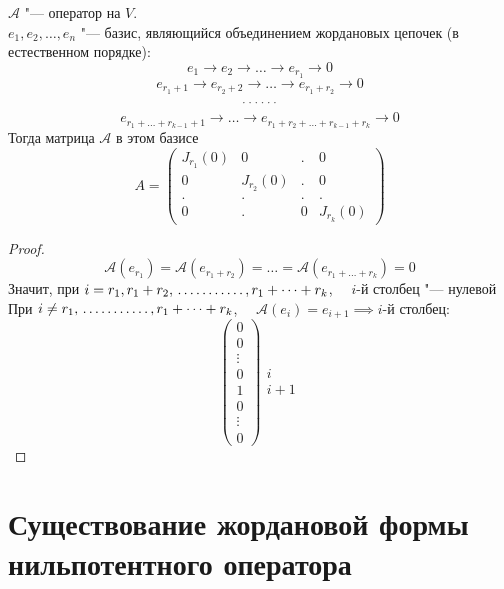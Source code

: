 \begin{lemma}
	$ \mathcal{A} $ "--- оператор на $ V $. \\
    $ e_1, e_2, \dots, e_n $ "--- базис, являющийся объединением жордановых цепочек (в естественном порядке):
	$$ e_1 \to e_2 \to \dots \to e_{r_1} \to 0 $$
	$$ e_{r_1 + 1} \to e_{r_2 + 2} \to \dots \to e_{r_1 + r_2} \to 0 $$
	$$ \widedots $$
	$$ e_{r_1 + \dots + r_{k - 1} + 1} \to \dots \to e_{r_1 + r_2 + \dots + r_{k - 1} + r_k} \to 0 $$
	Тогда матрица $ \mathcal{A} $ в этом базисе
	$$ A =
	\begin{pmatrix}
		J_{r_1}(0) & 0 & . & 0 \\
		0 & J_{r_2}(0) & . & 0 \\
		. & . & . & . \\
		0 & . & 0 & J_{r_k}(0)
	\end{pmatrix} $$
\end{lemma}

\begin{proof}
	$$ \mathcal{A}(e_{r_1}) = \mathcal{A}(e_{r_1 + r_2}) = \dots = \mathcal{A}(e_{r_1 + \dots + r_k}) = 0 $$
	Значит, при $ i = r_1, r_1 + r_2, \widedots[5em], r_1 + \dots + r_k $, $ \quad i $-й столбец "--- нулевой \\
	При $ i \ne r_1, \widedots[5em], r_1 + \dots + r_k $, $ \quad \mathcal{A}(e_i) = e_{i + 1} \implies i $-й столбец:
	$$
	\begin{pmatrix}
		0 \\
		0 \\
		\vdots \\
		0 \\
		1 \\
		0 \\
		\vdots \\
		0
	\end{pmatrix}
	\begin{matrix}
		\ \\
		\ \\
		\ \\
		i \\
		i + 1 \\
		\ \\
		\ \\
		\
	\end{matrix} $$
\end{proof}

\section{Существование жордановой формы нильпотентного оператора}

